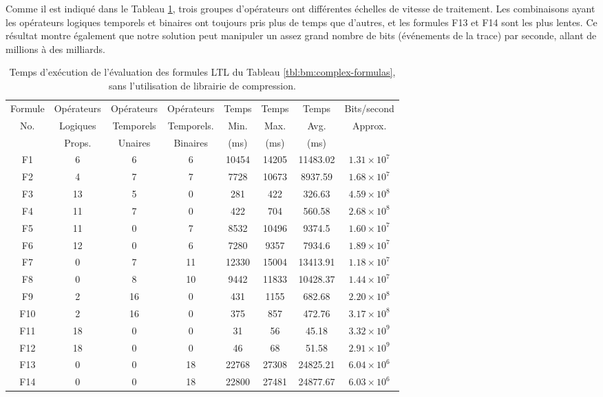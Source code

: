 Comme il est indiqué dans le Tableau \ref{tbl:bm:complex}, trois groupes d'opérateurs ont différentes échelles de vitesse de traitement. Les combinaisons ayant les opérateurs logiques temporels et binaires ont toujours pris plus de temps que d'autres, et les formules F13 et F14 sont les plus lentes. Ce résultat montre également que notre solution peut manipuler un assez grand nombre de bits (événements de la trace) par seconde, allant de millions à des milliards.

\begin{table}[h]
\centering
\small
\begin{tabular}{|c|c|c|c|c|c|c|c|}
\hline
Formule & Opérateurs & Opérateurs & Opérateurs & Temps & Temps & Temps & Bits/second \\
No. & Logiques & Temporels & Temporels. & Min.  & Max. & Avg. & Approx. \\
 & Props. & Unaires & Binaires & (ms) & (ms) & (ms) &  \\
\hline
F1 & 6 & 6 & 6 & 10454 & 14205 & 11483.02 & $1.31 \times 10^7$ \\
\hline
F2 & 4 & 7 & 7 & 7728 & 10673 & 8937.59 & $1.68 \times 10^7$  \\
\hline
F3 & 13 & 5 & 0 & 281 & 422 & 326.63 & $4.59 \times 10^8$  \\
\hline
F4 & 11 & 7 & 0 & 422 & 704 & 560.58 & $2.68 \times 10^8$  \\
\hline
F5 & 11 & 0 & 7 & 8532 & 10496 & 9374.5 & $1.60 \times 10^7$  \\
\hline
F6 & 12 & 0 & 6 & 7280 & 9357 & 7934.6 & $1.89 \times 10^7$  \\
\hline
F7 & 0 & 7 & 11 & 12330 & 15004 & 13413.91 & $1.18 \times 10^7$  \\
\hline
F8 & 0 & 8 & 10 & 9442 & 11833 & 10428.37 & $1.44 \times 10^7$  \\
\hline
F9 & 2 & 16 & 0 & 431 & 1155 & 682.68 & $2.20 \times 10^8$  \\
\hline
F10 & 2 & 16 & 0 & 375 & 857 & 472.76 & $3.17 \times 10^8$  \\
\hline
F11 & 18 & 0 & 0 & 31 & 56 & 45.18 & $3.32 \times 10^9$  \\
\hline
F12 & 18 & 0 & 0 & 46 & 68 & 51.58 & $2.91 \times 10^9$  \\
\hline
F13 & 0 & 0 & 18 & 22768 & 27308 & 24825.21 & $6.04 \times 10^6$  \\
\hline
F14 & 0 & 0 & 18 & 22800 & 27481 & 24877.67 & $6.03 \times 10^6$  \\
\hline
\end{tabular}
\vskip 8pt
\caption{Temps d'exécution de l'évaluation des formules LTL du Tableau \ref{tbl:bm:complex-formulas}, sans l'utilisation de librairie de compression.}
\label{tbl:bm:complex}
\end{table}

